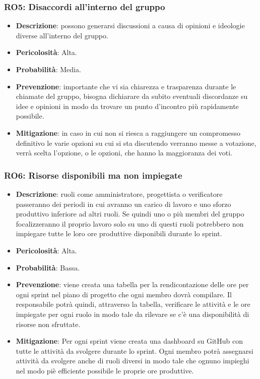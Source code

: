 \subsubsection{RO5: Disaccordi all'interno del gruppo}
\begin{itemize}
    \item \textbf{Descrizione}: possono generarsi discussioni a causa di opinioni e ideologie diverse all'interno del gruppo.
    \item \textbf{Pericolosità}: Alta.
    \item \textbf{Probabilità}: Media.
    \item \textbf{Prevenzione}: importante che vi sia chiarezza e trasparenza durante le chiamate del gruppo, bisogna dichiarare da subito eventuali discordanze su idee e opinioni in modo da trovare un punto d'incontro più rapidamente possibile.
    \item \textbf{Mitigazione}: in caso in cui non si riesca a raggiungere un compromesso definitivo le varie opzioni su cui si sta discutendo verranno messe a votazione, verrà scelta l'opzione, o le opzioni, che hanno la maggioranza dei voti. 
\end{itemize}

\subsubsection{RO6: Risorse disponibili ma non impiegate}
\begin{itemize}
    \item \textbf{Descrizione}: ruoli come amministratore, progettista o verificatore passeranno dei periodi in cui avranno un carico di lavoro e uno sforzo produttivo inferiore ad altri ruoli. 
    Se quindi uno o più membri del gruppo focalizzeranno il proprio lavoro solo su uno di questi ruoli potrebbero non impiegare tutte le loro ore produttive disponibili durante lo sprint.
    \item \textbf{Pericolosità}: Alta.
    \item \textbf{Probabilità}: Bassa.
    \item \textbf{Prevenzione}: viene creata una tabella per la rendicontazione delle ore per ogni sprint nel piano di progetto che ogni membro dovrà compilare.
    Il responsabile potrà quindi, attraverso la tabella, verificare le attività e le ore impiegate per ogni ruolo in modo tale da rilevare se c'è una disponibilità di risorse non sfruttate.
    \item \textbf{Mitigazione}:  Per ogni sprint viene creata una dashboard su GitHub con tutte le attività da svolgere durante lo sprint.
    Ogni membro potrà assegnarsi attività da svolgere anche di ruoli diversi in modo tale che ognuno impieghi nel modo piè efficiente possibile le proprie ore produttive.
\end{itemize}